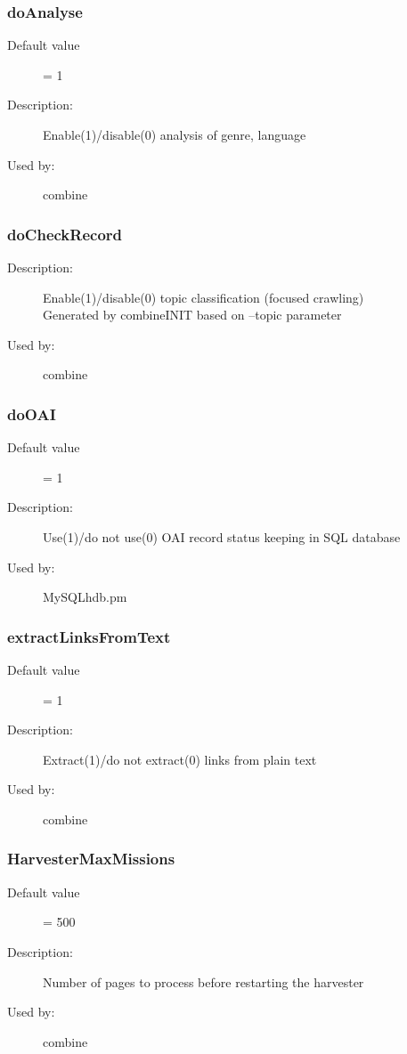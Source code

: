\subsubsection{doAnalyse}
\label{doAnalyse}
\begin{description}
\item[Default value] = 1
\item[Description:] Enable(1)/disable(0) analysis of genre, language
\item[Used by:] combine
\end{description}
\subsubsection{doCheckRecord}
\label{doCheckRecord}
\begin{description}
\item[Description:] Enable(1)/disable(0) topic classification (focused crawling) \\ Generated by combineINIT based on --topic parameter
\item[Used by:] combine
\end{description}
\subsubsection{doOAI}
\label{doOAI}
\begin{description}
\item[Default value] = 1
\item[Description:] Use(1)/do not use(0) OAI record status keeping in SQL database
\item[Used by:] MySQLhdb.pm
\end{description}
\subsubsection{extractLinksFromText}
\label{extractLinksFromText}
\begin{description}
\item[Default value] = 1
\item[Description:] Extract(1)/do not extract(0) links from plain text
\item[Used by:] combine
\end{description}
\subsubsection{HarvesterMaxMissions}
\label{HarvesterMaxMissions}
\begin{description}
\item[Default value] = 500
\item[Description:] Number of pages to process before restarting the harvester
\item[Used by:] combine
\end{description}
